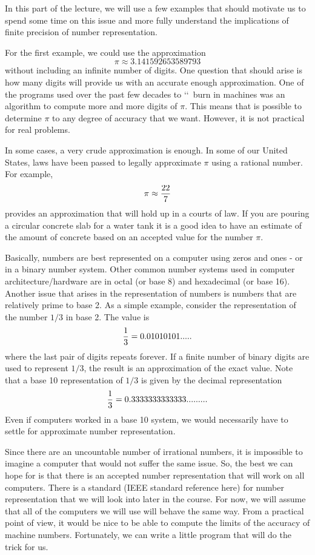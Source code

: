 \documentclass[10pt,fleqn]{article}
\begin{document}
In this part of the lecture, we will use a few examples that should motivate us
to spend some time on this issue and more fully understand the implications of
finite precision of number representation.

For the first example, we could use the approximation
$$\pi\approx 3.141592653589793$$
without including an infinite number of digits. One question that should arise
is how many digits will provide us with an accurate enough approximation. One
of the programs used over the past few decades to \lq\lq\ burn in machines was
an algorithm to compute more and more digits of $\pi$. This means that is
possible to determine $\pi$ to any degree of accuracy that we want. However, it
is not practical for real problems.

In some cases, a very crude approximation is enough. In some of our United
States, laws have been passed to legally approximate $\pi$ using a rational
number. For example,
$$\pi\approx {{22}\over 7}$$
provides an approximation that will hold up in a courts of law. If you are
pouring a circular concrete slab for a water tank it is a good idea to have an
estimate of the amount of concrete based on an accepted value for the number
$\pi$.

Basically, numbers are best represented on a computer using zeros and ones -
or in a binary number system. Other common number systems used in computer
architecture/hardware are in octal (or base 8) and hexadecimal (or base 16).
Another issue that arises in the representation of numbers is numbers that are
relatively prime to base 2. As a simple example, consider the representation of
the number $1/3$ in base 2.  The value is
$${1\over 3} = 0.01010101.....$$
where the last pair of digits repeats forever. If a finite number of binary
digits are used to represent $1/3$, the result is an approximation of the exact
value. Note that a base 10 representation of $1/3$ is given by the decimal
representation
$${1\over 3} = 0.3333333333333.........$$
Even if computers worked in a base 10 system, we would necessarily have to
settle for approximate number representation.

Since there are an uncountable number of irrational numbers, it is impossible to
imagine a computer that would not suffer the same issue. So, the best we can
hope for is that there is an accepted number representation that will work on
all computers. There is a standard (IEEE standard reference here) for number
representation that we will look into later in the course. For now, we will
assume that all of the computers we will use will behave the same way. From a
practical point of view, it would be nice to be able to compute the limits of
the accuracy of machine numbers. Fortunately, we can write a little program that
will do the trick for us.
\end{document}
